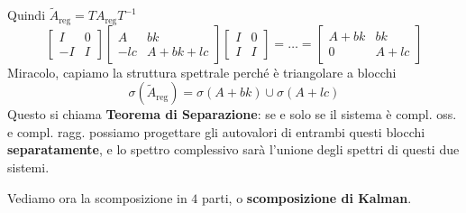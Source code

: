 Quindi $\tilde{A}_{\text{reg}} =TA_{\text{reg}} T^{-1}$
\begin{equation*}
	\begin{bmatrix}
		I  & 0 \\
		-I & I 
	\end{bmatrix}\begin{bmatrix}
	A & bk\\
	-lc & A+bk+lc
	\end{bmatrix}\begin{bmatrix}
	I & 0\\
	I & I
	\end{bmatrix} =\dotsc =\begin{bmatrix}
	A+bk & bk\\
	0 & A+lc
	\end{bmatrix}
\end{equation*}
Miracolo, capiamo la struttura spettrale perché è triangolare a blocchi
\begin{equation*}
	\sigma \left(\tilde{A}_{\text{reg}}\right) =\sigma (A+bk) \cup \sigma (A+lc)
\end{equation*}
Questo si chiama \textbf{Teorema di Separazione}: se e solo se il sistema è compl. oss. e compl. ragg. possiamo progettare gli autovalori di entrambi questi blocchi \textbf{separatamente}, e lo spettro complessivo sarà l'unione degli spettri di questi due sistemi.

Vediamo ora la scomposizione in $4$ parti, o \textbf{scomposizione di Kalman}.

